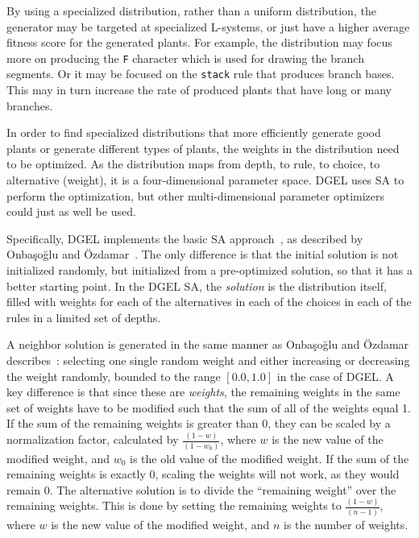 By using a specialized distribution, rather than a uniform distribution, the generator may be targeted at specialized \glspl{L-system}, or just have a higher average fitness score for the generated plants.
For example, the distribution may focus more on producing the \texttt{F} character which is used for drawing the \glspl{branch segment}.
Or it may be focused on the \texttt{stack} rule that produces \glspl{branch base}.
This may in turn increase the rate of produced plants that have long or many branches.

In order to find specialized distributions that more efficiently generate good plants or generate different types of plants, the weights in the distribution need to be optimized.
As the distribution maps from depth, to rule, to choice, to alternative (weight), it is a four-dimensional parameter space.
\gls{DGEL} uses \gls{SA} to perform the optimization, but other multi-dimensional parameter optimizers could just as well be used.

Specifically, \gls{DGEL} implements the basic \gls{SA} approach~\cite{2000Ozdamar}, as described by Onbaşoğlu and Özdamar~\cite{2001Onbasoglu}.
The only difference is that the initial solution is not initialized randomly, but initialized from a pre-optimized solution, so that it has a better starting point.
In the \gls{DGEL} \gls{SA}, the \textit{solution} is the distribution itself, filled with weights for each of the alternatives in each of the choices in each of the rules in a limited set of depths.

A neighbor solution is generated in the same manner as Onbaşoğlu and Özdamar describes~\cite{2001Onbasoglu}: selecting one single random weight and either increasing or decreasing the weight randomly, bounded to the range $[0.0, 1.0]$ in the case of \gls{DGEL}.
A key difference is that since these are \textit{weights}, the remaining weights in the same set of weights have to be modified such that the sum of all of the weights equal 1.
If the sum of the remaining weights is greater than 0, they can be scaled by a normalization factor, calculated by $\frac{(1 - w)}{(1 - w_0)}$, where $w$ is the new value of the modified weight, and $w_0$ is the old value of the modified weight.
If the sum of the remaining weights is exactly 0, scaling the weights will not work, as they would remain 0.
The alternative solution is to divide the ``remaining weight'' over the remaining weights.
This is done by setting the remaining weights to $\frac{(1 - w)}{(n - 1)}$, where $w$ is the new value of the modified weight, and $n$ is the number of weights.

